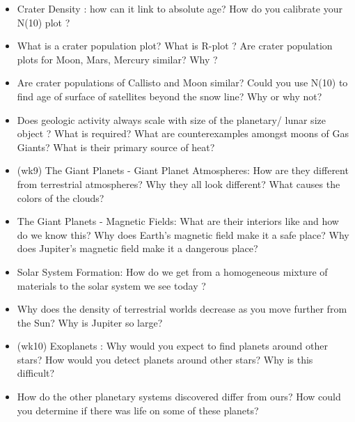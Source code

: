 \documentclass[paper=a4, fontsize=11pt]{scrartcl} %
\numberwithin{equation}{section} %
\begin{document}
\begin{itemize}

\item Crater Density : how can it link to absolute age?  How do you calibrate your N(10) plot  ? 
\item What is a crater population plot? What is R-plot ? Are crater population plots for Moon, Mars, Mercury similar?  Why  ? 
\item Are crater populations of Callisto and Moon  similar? Could you use N(10) to find age of surface of satellites beyond the snow line? Why or why not? 
\item Does geologic activity always scale with size of the planetary/ lunar size object ? What is required? What are counterexamples amongst moons of Gas Giants? What is their  primary  source of heat? 
\item  (wk9) The Giant Planets  - Giant Planet Atmospheres: How are they different from terrestrial atmospheres?
Why  they all look different?  What causes the colors of the clouds?
\item  The Giant Planets  - Magnetic Fields:   What are their interiors like and how do we know this?
Why does Earth's magnetic field make it a safe place?  Why does Jupiter's magnetic field make it a dangerous place?
\item   Solar System Formation: How do we get from a homogeneous mixture of materials to the solar system we see today ? 
\item  Why does the density of terrestrial worlds decrease as you move further from the Sun? Why is Jupiter so large?
\item (wk10)  Exoplanets : Why would you expect to find planets around other
stars?  How would you detect planets around other stars?   Why is this difficult?
\item  How do the other planetary systems discovered differ from ours?   How could you determine if there was life on some of these planets?


\end{itemize}



\end{document}
